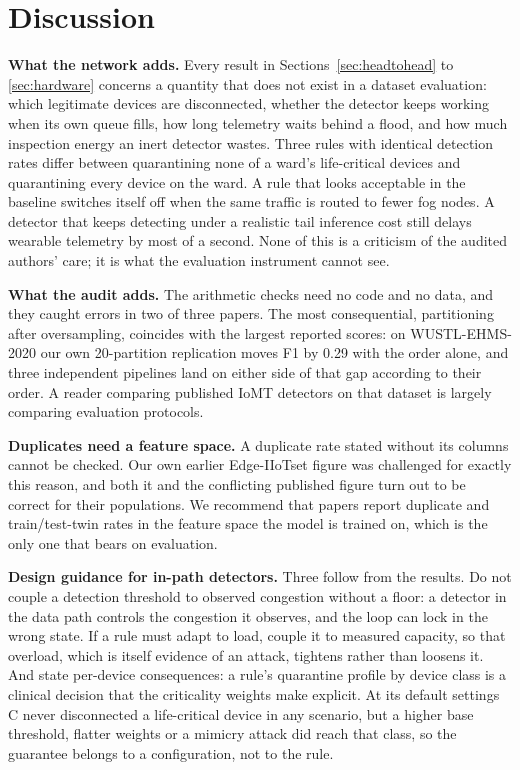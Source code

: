 \section{Discussion}\label{sec:discussion}
\noindent\textbf{What the network adds.} Every result in Sections~\ref{sec:headtohead} to \ref{sec:hardware} concerns a quantity that does not exist in a dataset evaluation: which legitimate devices are disconnected, whether the detector keeps working when its own queue fills, how long telemetry waits behind a flood, and how much inspection energy an inert detector wastes. Three rules with identical detection rates differ between quarantining none of a ward's life-critical devices and quarantining every device on the ward. A rule that looks acceptable in the baseline switches itself off when the same traffic is routed to fewer fog nodes. A detector that keeps detecting under a realistic tail inference cost still delays wearable telemetry by most of a second. None of this is a criticism of the audited authors' care; it is what the evaluation instrument cannot see.

\noindent\textbf{What the audit adds.} The arithmetic checks need no code and no data, and they caught errors in two of three papers. The most consequential, partitioning after oversampling, coincides with the largest reported scores: on WUSTL-EHMS-2020 our own 20-partition replication moves F1 by 0.29 with the order alone, and three independent pipelines land on either side of that gap according to their order. A reader comparing published IoMT detectors on that dataset is largely comparing evaluation protocols.

\noindent\textbf{Duplicates need a feature space.} A duplicate rate stated without its columns cannot be checked. Our own earlier Edge-IIoTset figure was challenged for exactly this reason, and both it and the conflicting published figure turn out to be correct for their populations. We recommend that papers report duplicate and train/test-twin rates in the feature space the model is trained on, which is the only one that bears on evaluation.

\noindent\textbf{Design guidance for in-path detectors.} Three follow from the results. Do not couple a detection threshold to observed congestion without a floor: a detector in the data path controls the congestion it observes, and the loop can lock in the wrong state. If a rule must adapt to load, couple it to measured capacity, so that overload, which is itself evidence of an attack, tightens rather than loosens it. And state per-device consequences: a rule's quarantine profile by device class is a clinical decision that the criticality weights make explicit. At its default settings C never disconnected a life-critical device in any scenario, but a higher base threshold, flatter weights or a mimicry attack did reach that class, so the guarantee belongs to a configuration, not to the rule.

